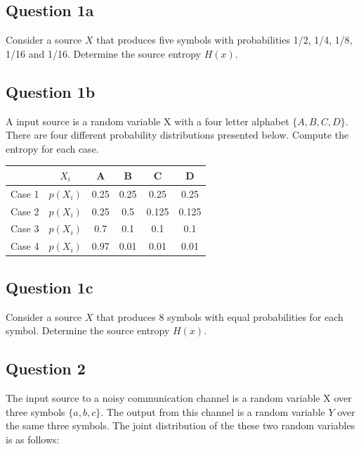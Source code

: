 \documentclass[a4paper,12pt]{article}
\begin{document}
\newpage
{}

\subsection*{Question 1a}
Consider a source $X$ that produces five symbols with probabilities 1/2, 1/4, 1/8, 1/16 and 1/16. Determine the source entropy $H(x)$. 

\subsection*{Question 1b}

A input source is a random variable X with a four letter alphabet $\{A,B,C,D\}$.
There are four different probability distributions presented below. Compute the entropy for each case.
\begin{center}
\begin{tabular}{|c|c|c|c|c|c|}
\hline	&	$X_i$	&	A	&	B	&	C	&	D	\\ \hline
Case 1	&	$p(X_i)$	&	0.25	&	0.25	&	0.25	&	0.25	\\ \hline
Case 2	&	$p(X_i)$	&	0.25	&	0.5	&	0.125	&	0.125	\\ \hline
Case 3	&	$p(X_i)$	&	0.7	&	0.1	&	0.1	&	0.1	\\ \hline
Case 4	&	$p(X_i)$	&	0.97	&	0.01	&	0.01	&	0.01	\\ \hline
\end{tabular} 
\end{center}
\subsection*{Question 1c}
Consider a source $X$ that produces 8 symbols with equal probabilities for each symbol. Determine the source entropy $H(x)$. 


\subsection*{Question 2}

The input source to a noisy communication channel is a random variable X over three symbols $\{a,b,c\}$. The output from this channel is a random variable $Y$ over the same three symbols. The joint distribution of the these two random variables is as follows:
\end{document}
